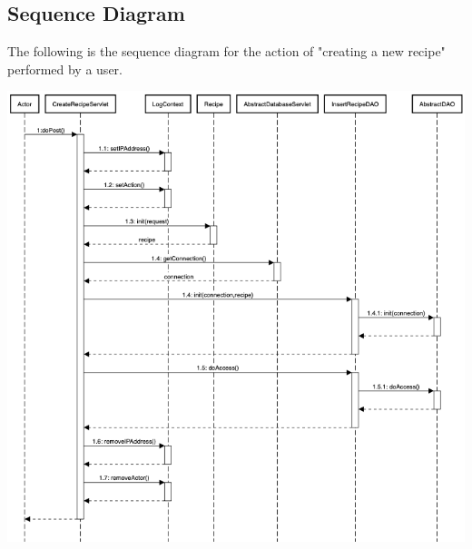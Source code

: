 \subsection{Sequence Diagram}
The following is the sequence diagram for the action of "creating a new recipe" performed by a user.

\includegraphics[width=\textwidth]{images/sequencediagram.png}